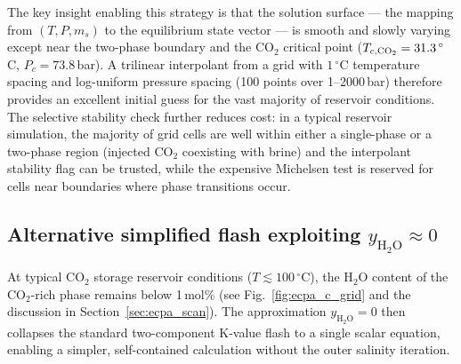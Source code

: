 \documentclass[preprint,12pt,number]{elsarticle}
\begin{document}
The key insight enabling this strategy is that the solution surface --- the mapping from
$(T, P, m_s)$ to the equilibrium state vector --- is smooth and slowly varying except near
the two-phase boundary and the CO$_2$ critical point ($T_{c,{\rm CO_2}} = 31.3\,^\circ$C, $P_c = 73.8$\,bar).
A trilinear interpolant from a grid with $1\,^\circ$C temperature spacing and log-uniform pressure
spacing (100 points over 1--2000\,bar) therefore provides an excellent initial guess for the vast
majority of reservoir conditions.
The selective stability check further reduces cost: in a typical reservoir simulation, the
majority of grid cells are well within either a single-phase or a two-phase region (injected CO$_2$ coexisting with
brine) and the interpolant stability flag can be trusted, while the expensive Michelsen test
is reserved for cells near boundaries where phase transitions occur.


\subsection{Alternative simplified flash exploiting \texorpdfstring{$y_{\text{H}_2\text{O}} \approx 0$}{yH2O = 0}}
\label{sec:simplified_flash}

At typical CO$_2$ storage reservoir conditions ($T \lesssim 100\,^\circ$C), the
H$_2$O content of the CO$_2$-rich phase remains below 1\,mol\%
(see Fig.~\ref{fig:ecpa_c_grid} and the discussion in Section~\ref{sec:ecpa_scan}).
The approximation $y_{\text{H}_2\text{O}} = 0$ then collapses the standard two-component
K-value flash to a single scalar equation, enabling a simpler, self-contained
calculation without the outer salinity iteration.
\end{document}
